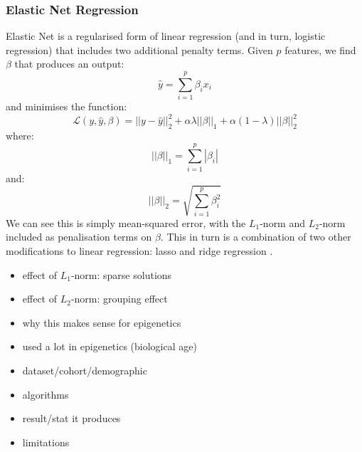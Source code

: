 \documentclass{article}
\begin{document}
\subsubsection{Elastic Net Regression}
Elastic Net \cite{zou2005regularization} is a regularised form of linear regression (and in turn, logistic regression) that includes two additional penalty terms.
Given \(p\) features, we find \(\beta\) that produces an output:
\[\hat{y} = \sum_{i=1}^{p} \beta_ix_i\]
and minimises the function:
\[\mathcal{L}(y, \hat{y}, \beta) = ||y - \hat{y}||_2^2
    + \alpha\lambda||\beta||_1
    + \alpha(1 - \lambda)||\beta||_2^2\]
where:
\[||\beta||_1 = \sum_{i=1}^{p} |\beta_i|\]
and:
\[||\beta||_2 = \sqrt{\sum_{i=1}^{p} \beta_i^2}\]
We can see this is simply mean-squared error, with the \(L_1\)-norm and \(L_2\)-norm included as penalisation terms on \(\beta\). This in turn is a combination of two other modifications to linear regression: lasso and ridge regression \cite{tibshirani1996regression, hoerl1970ridge}.

\begin{itemize}
    \item effect of \(L_1\)-norm: sparse solutions
    \item effect of \(L_2\)-norm: grouping effect
    \item why this makes sense for epigenetics
    \item used a lot in epigenetics (biological age)
\end{itemize}

\vspace{1cm}
\begin{itemize}
    \item dataset/cohort/demographic
    \item algorithms
    \item result/stat it produces
    \item limitations
\end{itemize}
\end{document}
